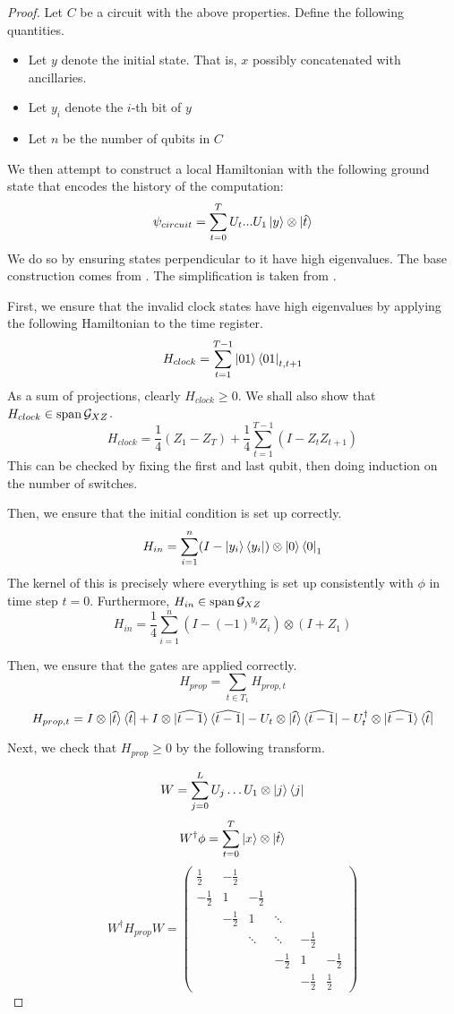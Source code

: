 \begin{proof}

Let $C$ be a circuit with the above properties. Define the following quantities.
\begin{itemize}
	\item Let $y$ denote the initial state. That is, $x$ possibly concatenated with ancillaries.
	\item Let $y_i$ denote the $i$-th bit of $y$
	\item Let $n$ be the number of qubits in $C$
\end{itemize}

We then attempt to construct a local Hamiltonian with the following ground state that encodes the history of the computation: $$\psi_{circuit}=\sum_{t=0}^TU_t...U_1\ket{y}\otimes\ket{\hat{t}}$$
We do so by ensuring states perpendicular to it have high eigenvalues. The base construction comes from \cite{kitaev2002classical}. The simplification is taken from \cite{PhysRevA.78.012352}.

First, we ensure that the invalid clock states have high eigenvalues by applying the following Hamiltonian to the time register.
$$H_{clock}=\sum_{t=1}^{T-1}\ket{01}\bra{01}_{t,t+1}$$
As a sum of projections, clearly $H_{clock}\geq 0$. We shall also show that $H_{clock}\in\operatorname*{\operatorname{span}}\mathcal{G}_{XZ}$.
$$H_{clock}=\frac{1}{4}(Z_1 - Z_T) + \frac{1}{4}\sum_{t=1}^{T-1}(I-Z_tZ_{t+1}) $$
This can be checked by fixing the first and last qubit, then doing induction on the number of switches.

Then, we ensure that the initial condition is set up correctly.
$$H_{in}=\sum_{i=1}^n(I-\ket{y_i}\bra{y_i})\otimes\ket{0}\bra{0}_1$$
The kernel of this is precisely where everything is set up consistently with $\phi$ in time step $t=0$. Furthermore, $H_{in}\in\operatorname*{\operatorname{span}}\mathcal{G}_{XZ}$
$$H_{in}=\frac{1}{4}\sum_{i=1}^n(I-(-1)^{y_i}Z_i)\otimes(I+Z_1)$$

Then, we ensure that the gates are applied correctly.
$$H_{prop}=\sum_{t\in T_1}H_{prop,t}$$
$$H_{prop,t}=I\otimes\ket{\widehat{t}}\bra{\widehat{t}}
	+I\otimes\ket{\widehat{t-1}}\bra{\widehat{t-1}}
	-U_t\otimes\ket{\widehat{t}}\bra{\widehat{t-1}}
	-U_t^\dagger\otimes\ket{\widehat{t-1}}\bra{\widehat{t}}$$

Next, we check that $H_{prop}\geq0$ by the following transform.

$$W=\sum_{j=0}^L U_j\ldots U_1\otimes\ket{j}\bra{j}$$
$$W^\dagger\phi=\sum_{t=0}^T\ket{x}\otimes\ket{\hat{t}}$$
$$W^\dagger H_{prop} W=
\begin{pmatrix}
	\frac{1}{2} & -\frac{1}{2} & & & &  \\
	-\frac{1}{2} & 1 & -\frac{1}{2} & & & \\
	& -\frac{1}{2} & 1 & \ddots & & \\
	& & \ddots & \ddots & -\frac{1}{2} & \\
	& & & -\frac{1}{2} & 1 & -\frac{1}{2} \\
	& & & & -\frac{1}{2} & \frac{1}{2}
\end{pmatrix}$$


\end{proof}
